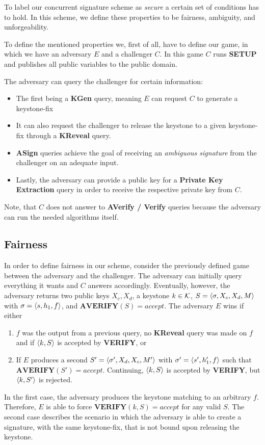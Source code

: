 To label our concurrent signature scheme as \textit{secure} a certain set of conditions has to hold. 
In this scheme, we define these properties to be fairness, ambiguity, and unforgeability.

To define the mentioned properties we, first of all, have to define our game, in which we have an adversary \(E\) and a challenger \(C\).
In this game \(C\) runs \textbf{SETUP} and publishes all public variables to the public domain. 

The adversary can query the challenger for certain information:
\begin{itemize}
  \item The first being a \textbf{KGen} query, meaning \(E\) can request \(C\) to generate a keystone-fix
  \item It can also request the challenger to release the keystone to a given keystone-fix through a \textbf{KReveal} query.
  \item \textbf{ASign} queries achieve the goal of receiving an \textit{ambiguous signature} from the challenger on an adequate input. 
  \item Lastly, the adversary can provide a public key for a \textbf{Private Key Extraction} query in order to receive the respective private key from \(C\).
\end{itemize}

Note, that \(C\) does not answer to \textbf{AVerify / Verify} queries because the adversary can run the needed algorithms itself.

\subsection{Fairness}
  In order to define fairness in our scheme, consider the previously defined game between the adversary and the challenger.
  The adversary can initially query everything it wants and \(C\) answers accordingly.
  Eventually, however, the adversary returns two public keys \(X_c, X_d\), a keystone \(k\in\mathcal{K}\), \(S=\langle \sigma, X_c, X_d, M \rangle\) with \(\sigma=\langle s, h_1, f \rangle\), and \(\textbf{AVERIFY}(S) = accept\).
  The adversary \(E\) wins if either
    \begin{enumerate}
      \item \(f\) was the output from a previous query, no \textbf{KReveal} query was made on \(f\) and if \(\langle k,S \rangle\) is accepted by \textbf{VERIFY}, or
      \item If \(E\) produces a second \(S' = \langle \sigma', X_d, X_c, M' \rangle\) with \(\sigma' = \langle s', h_1', f \rangle\) such that \(\textbf{AVERIFY}(S')=accept\).
            Continuing, \(\langle k,S \rangle\) is accepted by \textbf{VERIFY}, but  \(\langle k,S' \rangle\) is rejected.
    \end{enumerate}
  In the first case, the adversary produces the keystone matching to an arbitrary \(f\).
  Therefore, \(E\) is able to force \(\textbf{VERIFY}(k, S) = \textit{accept}\) for any valid \(S\).
  The second case describes the scenario in which the adversary is able to create a signature, with the same keystone-fix, that is not bound upon releasing the keystone.

